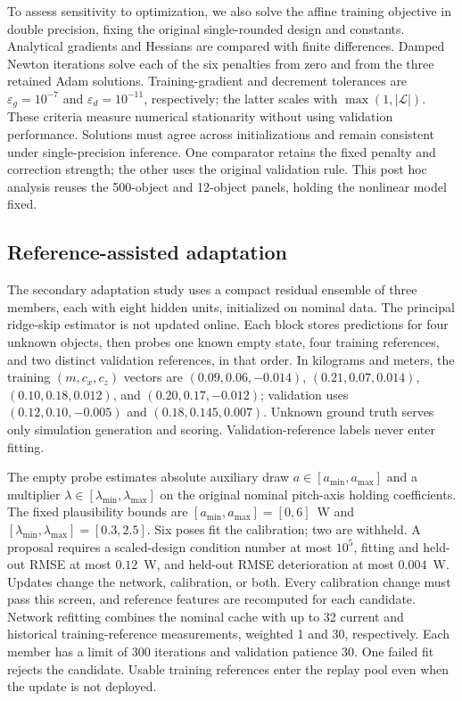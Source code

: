 \documentclass[12pt,a4paper]{article}
\begin{document}
To assess sensitivity to optimization, we also solve the affine training
objective in double precision, fixing the original single-rounded design
and constants. Analytical gradients and Hessians are compared with finite
differences. Damped Newton iterations solve each of the six penalties
from zero and from the three retained Adam solutions. Training-gradient
and decrement tolerances are $\varepsilon_g=10^{-7}$ and
$\varepsilon_d=10^{-11}$, respectively; the latter scales with
$\max(1,|\mathcal L|)$. These criteria measure numerical stationarity
without using validation performance. Solutions must agree across
initializations and remain consistent under single-precision inference.
One comparator retains the fixed penalty and correction strength; the
other uses the original validation rule. This post hoc analysis reuses
the 500-object and 12-object panels, holding the nonlinear model fixed.


\subsection{Reference-assisted adaptation}
The secondary adaptation study uses a compact residual ensemble of three
members, each with eight hidden units, initialized on nominal data. The
principal ridge-skip estimator is not updated online. Each block stores
predictions for four unknown objects, then probes one known empty state,
four training references, and two distinct validation references, in
that order. In kilograms and meters, the training $(m,c_x,c_z)$ vectors are
$(0.09,0.06,-0.014)$, $(0.21,0.07,0.014)$,
$(0.10,0.18,0.012)$, and $(0.20,0.17,-0.012)$;
validation uses $(0.12,0.10,-0.005)$ and $(0.18,0.145,0.007)$.
Unknown ground truth serves only simulation generation and scoring.
Validation-reference labels never enter fitting.

The empty probe estimates absolute auxiliary draw $a\in[a_{\min},a_{\max}]$
and a multiplier $\lambda\in[\lambda_{\min},\lambda_{\max}]$ on the original
nominal pitch-axis holding coefficients. The fixed plausibility bounds are
$[a_{\min},a_{\max}]=[0,6]$~W and
$[\lambda_{\min},\lambda_{\max}]=[0.3,2.5]$. Six poses fit the calibration;
two are withheld. A proposal requires a scaled-design condition number at
most $10^5$, fitting and held-out RMSE at most $0.12$~W, and held-out RMSE
deterioration at most $0.004$~W. Updates change the network, calibration,
or both. Every calibration change must pass this screen, and reference
features are recomputed for each candidate. Network refitting combines the
nominal cache with up to 32 current and historical training-reference
measurements, weighted 1 and 30, respectively. Each member has a limit of
300 iterations and validation patience 30. One failed fit rejects the
candidate. Usable training references enter the replay pool even when the
update is not deployed.
\end{document}
